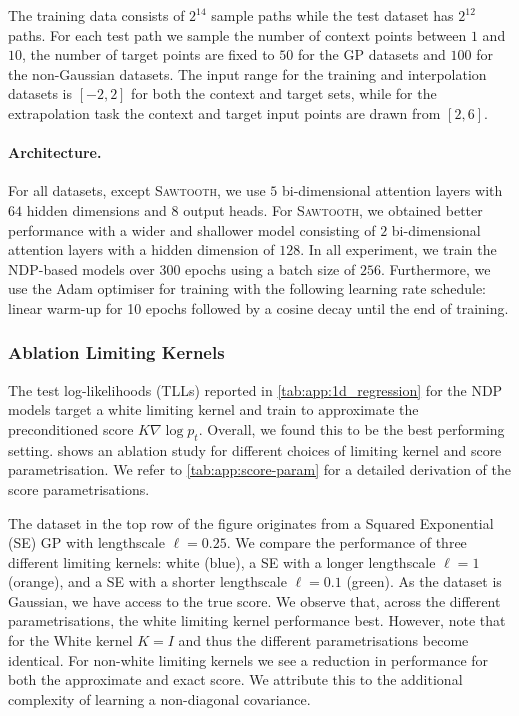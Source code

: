 The training data consists of $2^{14}$ sample paths while the test dataset has $2^12$ paths.
For each test path we sample the number of context points between $1$ and $10$, the number of target points are fixed to $50$ for the GP datasets and $100$ for the non-Gaussian datasets.
The input range for the training and interpolation datasets is $[-2, 2]$ for both the context and target sets, while for the extrapolation task the context and target input points are drawn from $[2, 6]$.

\paragraph{Architecture.}
For all datasets, except {\scshape Sawtooth}, we use $5$ bi-dimensional attention layers \parencite{dutordoir2022Neural} with $64$ hidden dimensions and $8$ output heads.
For {\scshape Sawtooth}, we obtained better performance with a wider and shallower model consisting of $2$ bi-dimensional attention layers with a hidden dimension of $128$.
In all experiment, we train the NDP-based models over $300$ epochs using a batch size of $256$.
Furthermore, we use the Adam optimiser for training with the following learning rate schedule: linear warm-up for 10 epochs followed by a cosine decay until the end of training.

\subsubsection{Ablation Limiting Kernels}

The test log-likelihoods (TLLs) reported in \cref{tab:app:1d_regression} for the NDP models target a white limiting kernel and train to approximate the preconditioned score $K \nabla \log p_t$.
Overall, we found this to be the best performing setting.
 shows an ablation study for different choices of limiting kernel and score parametrisation.
We refer to \cref{tab:app:score-param} for a detailed derivation of the score parametrisations.

The dataset in the top row of the figure originates from a Squared Exponential (SE) GP with lengthscale $\ell = 0.25$.
We compare the performance of three different limiting kernels: white (blue), a SE with a longer lengthscale $\ell=1$ (orange), and a SE with a shorter lengthscale $\ell=0.1$ (green).
As the dataset is Gaussian, we have access to the true score.
We observe that, across the different parametrisations, the white limiting kernel performance best.
However, note that for the White kernel $K = I$ and thus the different parametrisations become identical.
For non-white limiting kernels we see a reduction in performance for both the approximate and exact score.
We attribute this to the additional complexity of learning a non-diagonal covariance.


